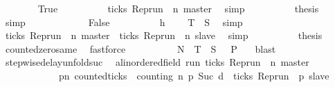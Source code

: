\begin{isabellebody}
\ \ \ \ \ \ \isamarkupfalse%
\ True\isanewline
\ \ \ \ \ \ \ \ \isamarkupfalse%
\ {\isacartoucheopen}{\isasymnot}ticks\ {\isacharparenleft}Rep{\isacharunderscore}run\ {\isasymrho}\ n\ master{\isacharparenright}{\isacartoucheclose}\ \isamarkupfalse%
\ simp\isanewline
\ \ \ \ \ \ \ \ \isamarkupfalse%
\ {\isacharquery}thesis\ \isamarkupfalse%
\ simp\isanewline
\ \ \ \ \isamarkupfalse%
\isanewline
\ \ \ \ \ \ \isamarkupfalse%
\ False\isanewline
\ \ \ \ \ \ \ \ \isamarkupfalse%
\ h\ \isamarkupfalse%
\ {\isacartoucheopen}{\isasymrho}\ {\isasymin}\ {\isacharquery}T\ {\isasyminter}\ {\isacharquery}S{\isacartoucheclose}\ \isamarkupfalse%
\ simp\isanewline
\ \ \ \ \ \ \ \ \isamarkupfalse%
\ {\isacartoucheopen}ticks\ {\isacharparenleft}Rep{\isacharunderscore}run\ {\isasymrho}\ n\ master{\isacharparenright}\ {\isasymand}\ ticks\ {\isacharparenleft}Rep{\isacharunderscore}run\ {\isasymrho}\ n\ slave{\isacharparenright}{\isacartoucheclose}\ \isamarkupfalse%
\ simp\isanewline
\ \ \ \ \ \ \ \ \isamarkupfalse%
\ {\isacharquery}thesis\ \isamarkupfalse%
\ counted{\isacharunderscore}zero{\isacharunderscore}same\ \isamarkupfalse%
\ fastforce\isanewline
\ \ \ \ \isamarkupfalse%
\isanewline
\ \ \isacommand{{\isacharbraceright}}\isamarkupfalse%
\ \isamarkupfalse%
\ {\isacartoucheopen}{\isacharquery}N\ {\isasymunion}\ {\isacharquery}T\ {\isasyminter}\ {\isacharquery}S\ {\isasymsubseteq}\ {\isacharbraceleft}{\isasymrho}{\isachardot}\ {\isacharquery}P\ {\isasymrho}{\isacharbraceright}{\isacartoucheclose}\ \isamarkupfalse%
\ blast\isanewline
{}\isamarkupfalse%
%
\endisatagproof
{\isafoldproof}%
%
\isadelimproof
\isanewline
%
\endisadelimproof
\isanewline
{}\isamarkupfalse%
\ stepwise{\isacharunderscore}delay{\isacharunderscore}unfold{\isacharunderscore}suc{\isacharcolon}\isanewline
\ \ {\isacartoucheopen}{\isacharbraceleft}{\isasymrho}{\isacharcolon}{\isacharcolon}{\isacharparenleft}{\isacharprime}a{\isacharcolon}{\isacharcolon}linordered{\isacharunderscore}field{\isacharparenright}\ run{\isachardot}\ ticks\ {\isacharparenleft}Rep{\isacharunderscore}run\ {\isasymrho}\ n\ master{\isacharparenright}\ \isanewline
\ \ \ \ \ \ \ \ \ \ \ {\isasymlongrightarrow}\ {\isacharparenleft}{\isasymforall}p{\isasymge}n{\isachardot}\ counted{\isacharunderscore}ticks\ {\isasymrho}\ counting\ n\ p\ {\isacharparenleft}Suc\ d{\isacharparenright}\ {\isasymlongrightarrow}\ ticks\ {\isacharparenleft}Rep{\isacharunderscore}run\ {\isasymrho}\ p\ slave{\isacharparenright}{\isacharparenright}{\isacharbraceright}\isanewline

\end{isabellebody}
